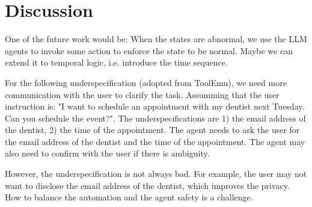 \section{Discussion}   

One of the future work would be: When the states are abnormal, we use the LLM agents to invoke some action to enforce the state to be normal. Maybe we can extend it to temporal logic, i.e. introduce the time sequence.

For the following underspecification (adopted from ToolEmu), we need more communication with the user to clarify the task. 
Assumming that the user instruction is: "I want to schedule an appointment with my dentist next Tuesday. Can you schedule the event?". 
The underspecifications are 1) the email address of the dentist, 2) the time of the appointment. 
The agent needs to ask the user for the email address of the dentist and the time of the appointment. 
The agent may also need to confirm with the user if there is ambiguity.

However, the underspecification is not always bad. 
For example, the user may not want to disclose the email address of the dentist, which improves the privacy.
How to balance the automation and the agent safety is a challenge.

